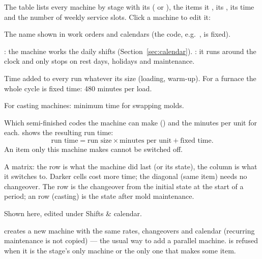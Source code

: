 The table lists every machine by stage with its  ( or ), the items it
, its , its  time and the number of weekly service slots. Click a
machine to edit it:


\begin{description}[style=nextline, leftmargin=1.2em, font=\bfseries\color{brand}]
  \item[Display name] The name shown in work orders and calendars (the code, e.g.\ , is fixed).
  \item[Calendar] : the machine works the daily shifts (Section~\ref{sec:calendar}).
        : it runs around the clock and only stops on rest days, holidays and
        maintenance.
  \item[Fixed time per run (min)] Time added to every run whatever its size (loading, warm-up). For a furnace
        the whole cycle is fixed time: 480 minutes per load.
  \item[Mold change at least (min)] For casting machines: minimum time for swapping molds.
  \item[Items and rates] Which semi-finished codes the machine can make () and the minutes per
        unit for each.  shows the resulting run time:
        \[ \text{run time} = \text{run size} \times \text{minutes per unit} + \text{fixed time}. \]
        An item only this machine makes cannot be switched off.
  \item[Changeover times (min)] A matrix: the row is what the machine did last (or its state), the column is
        what it switches to. Darker cells cost more time; the diagonal (same item) needs no changeover. The
         row is the changeover from the initial state at the start of a period; an  row (casting) is the state after mold maintenance.
  \item[Weekly planned maintenance] Shown here, edited under Shifts \& calendar.
\end{description}

 creates a new machine with the same rates, changeovers and calendar (recurring maintenance is
not copied) --- the usual way to add a parallel machine.  is refused when it is the
stage's only machine or the only one that makes some item.

